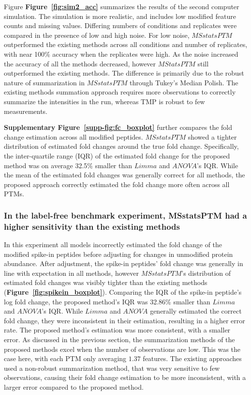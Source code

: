 \documentclass[mcp]{article}
\numberwithin{table}{section}
\def\figref#1{{\bf Figure~\ref{fig:#1}}}
\begin{document}
Figure \figref{sim2_acc} summarizes the results of the second computer simulation. The simulation is more realistic, and includes low modified feature counts and missing values. Differing numbers of conditions and replicates were compared in the presence of low and high noise. For low noise, $MSstatsPTM$ outperformed the existing methods across all conditions and number of replicates, with near 100\% accuracy when the replicates were high. As the noise increased the accuracy of all the methods decreased, however $MStatsPTM$ still outperformed the existing methods. The difference is primarily due to the robust nature of summarization in $MSstatsPTM$ through Tukey's Median Polish. The existing methods summation approach requires more observations to correctly summarize the intensities in the run, whereas TMP is robust to few measurements.

{\bf Supplementary Figure~\ref{supp-fig:fc_boxplot}} further compares the fold change estimation across all modified peptides. $MSstatsPTM$ showed a tighter distribution of estimated fold changes around the true fold change. Specifically, the inter-quartile range (IQR) of the estimated fold change for the proposed method was on average 32.5\% smaller than $Limma$ and $ANOVA$'s IQR. While the mean of the estimated fold changes was generally correct for all methods, the proposed approach correctly estimated the fold change more often across all PTMs.

\subsubsection*{In the label-free benchmark experiment, MSstatsPTM had a higher sensitivity than the existing methods}

In this experiment all models incorrectly estimated the fold change of the modified spike-in peptides before adjusting for changes in unmodified protein abundance. After adjustment, the spike-in peptides' fold change was generally in line with expectation in all methods, however $MSstatsPTM$'s distribution of estimated fold changes was visibly tighter than the existing methods (\figref{spikein_boxplot}). Comparing the IQR of the spike-in peptide's log fold change, the proposed method's IQR was 32.86\% smaller than $Limma$ and $ANOVA$'s IQR. While $Limma$ and $ANOVA$ generally estimated the correct fold change, they were inconsistent in their estimation, resulting in a higher error rate. The proposed method's estimation was more consistent, with a smaller error. As discussed in the previous section, the summarization methods of the proposed methods excel when the number of observations are low. This was the case here, with each PTM only averaging $1.37$ features. The existing approaches used a non-robust summarization method, that was very sensitive to few observations, causing their fold change estimation to be more inconsistent, with a larger error compared to the proposed method.
\end{document}
